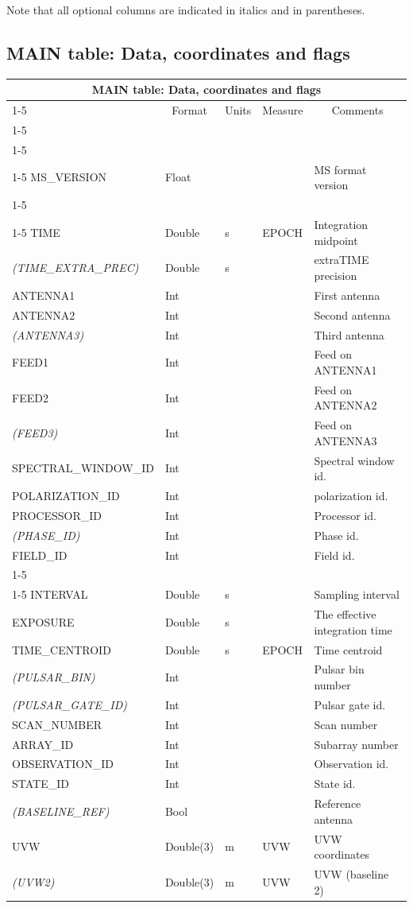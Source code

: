 \documentclass{article}
\newcommand{\defline}[1]{\cline{1-5}
\multicolumn{5}{|l|}{#1} \\
\cline{1-5}}
\newcommand{\definetable}[2]
{
	\vfill\newpage
	\subsection{#1}
        \vspace{0.15in}
        \small
	\begin{tabular}{|l|p{1.25in}|l|p{.9in}|p{1.4in}|}
	\hline
	\multicolumn{5}{|c|}{\bf #1}\\ 
	\cline{1-5}
        \multicolumn{1}{|c|}{Name}&\multicolumn{1}{|c|}{Format}&
        \multicolumn{1}{|c|}{Units}&\multicolumn{1}{|c|}{Measure}&
        \multicolumn{1}{|c|}{Comments}\\
        \cline{1-5}
        #2
        \hline
	\end{tabular}
}
\begin{document}
\par

Note that all optional columns are indicated in italics and in parentheses.

\definetable{MAIN table: Data, coordinates and flags}
{
\defline{\bf Columns}
\defline{\em Keywords}
MS\_VERSION   & Float  & & & MS format version \\
\defline{\em Key}
TIME  &         Double  &      s   &     EPOCH    & Integration midpoint \\
{\it (TIME\_EXTRA\_PREC)} & Double & s       &     & extraTIME precision \\
ANTENNA1  &      Int    &          &              & First antenna \\
ANTENNA2  &      Int    &          &              & Second antenna \\
{\it (ANTENNA3)} & Int    &          &              & Third antenna \\
FEED1  &      Int       &          &              & Feed on ANTENNA1 \\
FEED2  &      Int       &          &              & Feed on ANTENNA2 \\
{\it (FEED3)} & Int       &          &              & Feed on ANTENNA3 \\
SPECTRAL\_WINDOW\_ID  &  Int   &          &        & Spectral window id.\\
POLARIZATION\_ID  &  Int   &          &        & polarization id.\\
PROCESSOR\_ID  & Int   &          &        & Processor id.\\
{\it (PHASE\_ID)} & Int &               &         & Phase id.\\
FIELD\_ID  &      Int   &          &        & Field id.\\
\defline{\em Non-key attributes}
INTERVAL  &      Double &       s  &      & Sampling interval \\
EXPOSURE  &      Double &       s  &      & The effective integration time \\
TIME\_CENTROID & Double &       s  &    EPOCH & Time centroid \\
{\it (PULSAR\_BIN)} & Int &          &      & Pulsar bin number \\
{\it (PULSAR\_GATE\_ID)} & Int &         &      & Pulsar gate id. \\   
SCAN\_NUMBER  &   Int   &          &      & Scan number  \\ 
ARRAY\_ID  &      Int   &          &      & Subarray number\\
OBSERVATION\_ID  & Int   &          &     & Observation id.\\
STATE\_ID & Int   &          &              & State id.\\
{\it (BASELINE\_REF)} &  Bool  &     &      & Reference antenna \\
UVW       &   Double(3) &      m   & UVW  & UVW coordinates \\
{\it (UVW2)} &  Double(3) &      m   & UVW  & UVW (baseline 2) \\
}
\end{document}
